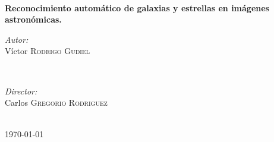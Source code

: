 \begin{titlepage}
		\HRule \\[0.2cm]
		{ \huge \bfseries Reconocimiento automático de galaxias y estrellas en imágenes astronómicas.} %
		\HRule \\[0.4cm]
		
		
		\begin{minipage}{0.4\textwidth}
			\begin{flushleft} \large
				\emph{Autor:}\\
				Víctor \textsc{Rodrigo Gudiel} %
			\end{flushleft}
		\end{minipage}
		~
		\begin{minipage}{0.4\textwidth}
			\begin{flushright} \large
				\emph{Director:} \\
				Carlos  \textsc{Gregorio Rodriguez} %
			\end{flushright}
		\end{minipage}\\[0.4cm] 
		

		
			
			{\large \today}\\[2cm] %
		\vfill %
		
	\end{titlepage}

